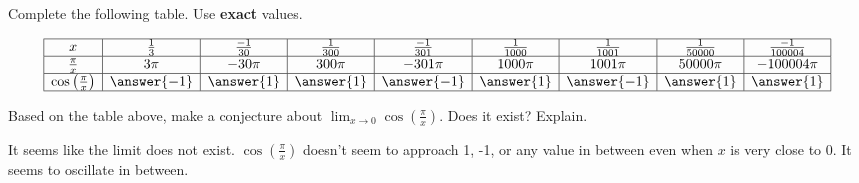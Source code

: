 \documentclass{ximera}
\author{Nela Lakos \and Kyle Parsons}
\begin{document}
\begin{exercise}

Complete the following table.  Use \textbf{exact} values.

\[
\begin{array}{|c|c|c|c|c|c|c|c|c|}
\hline
x & \frac{1}{3} & \frac{-1}{30} & \frac{1}{300} & \frac{-1}{301} & \frac{1}{1000} & \frac{1}{1001} & \frac{1}{50000} & \frac{-1}{100004}\\\hline
\frac{\pi}{x} & 3\pi & -30\pi & 300\pi & -301\pi & 1000\pi & 1001\pi & 50000\pi & -100004\pi \\\hline
\cos\left(\frac{\pi}{x}\right) & \answer{-1} & \answer{1} & \answer{1} & \answer{-1} & \answer{1} & \answer{-1} & \answer{1} & \answer{1} \\\hline
\end{array}
\]

\begin{exercise}
Based on the table above, make a conjecture about $\lim_{x\to0}\cos\left(\frac{\pi}{x}\right)$.  Does it exist? Explain.
\begin{freeResponse}
It seems like the limit does not exist.  $\cos\left(\frac{\pi}{x}\right)$ doesn't seem to approach 1, -1, or any value in between even when $x$ is very close to 0.  It seems to oscillate in between.
\end{freeResponse}
\end{exercise}

\end{exercise}
\end{document}
